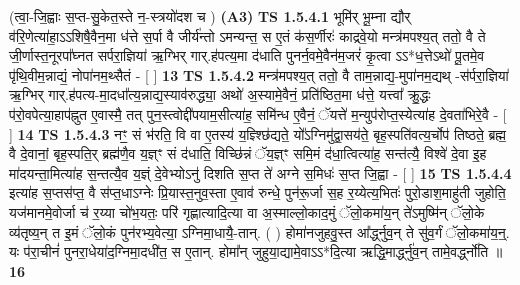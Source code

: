 \documentclass[17pt]{extarticle}
\begin{document}
                      (त्वा॒-जि॒ह्वाः स॒प्त-सु॒केत॒स्ते न॒-स्त्रयो॑दश च )  \textbf{(A3)} \newline \newline
                                        \textbf{ TS 1.5.4.1} \newline
                  भूमि॑र् भू॒म्ना द्यौर् व॑रि॒णेत्या॑हा॒ऽऽशिषै॒वैन॒मा ध॑त्ते स॒र्पा वै जीर्य॑न्तो ऽमन्यन्त॒ स ए॒तं क॑स॒र्णीरः॑ काद्रवे॒यो मन्त्र॑मपश्य॒त् ततो॒ वै ते जी॒र्णास्त॒नूरपा᳚घ्नत सर्परा॒ज्ञिया॑ ऋ॒ग्भिर् गार्.ह॑पत्य॒मा द॑धाति पुनर्न॒वमे॒वैन॑म॒जरं॑ कृ॒त्वा ऽऽ*ध॒त्तेऽथो॑ पू॒तमे॒व पृ॑थि॒वीम॒न्नाद्यं॒ नोपा॑नम॒थ्सैतं - [ ] \textbf{  13} \newline
                  \newline
                                \textbf{ TS 1.5.4.2} \newline
                  मन्त्र॑मपश्य॒त् ततो॒ वै ताम॒न्नाद्य॒-मुपा॑नम॒द्यथ् -स॑र्परा॒ज्ञिया॑ ऋ॒ग्भिर् गार्.ह॑पत्य-मा॒दधा᳚त्य॒न्नाद्य॒स्याव॑रुद्ध्या॒ अथो॑ अ॒स्यामे॒वैनं॒ प्रति॑ष्ठित॒मा ध॑त्ते॒ यत्त्वा᳚ क्रु॒द्धः प॑रो॒वपेत्या॒हाप॑ह्नुत ए॒वास्मै॒ तत् पुन॒स्त्वोद्दी॑पयाम॒सीत्या॑ह॒ समि॑न्ध ए॒वैनं॒ ॅयत्ते॑ म॒न्युप॑रोप्त॒स्येत्या॑ह दे॒वता॑भिरे॒वै - [ ] \textbf{  14} \newline
                  \newline
                                \textbf{ TS 1.5.4.3} \newline
                  नꣳ॒॒ सं भ॑रति॒ वि वा ए॒तस्य॑ य॒ज्ञ्श्छि॑द्यते॒ यो᳚ऽग्निमु॑द्वा॒सय॑ते॒ बृह॒स्पति॑वत्य॒र्चोप॑ तिष्ठते॒ ब्रह्म॒ वै दे॒वानां॒ बृह॒स्पति॒र् ब्रह्म॑णै॒व य॒ज्ञ्ꣳ सं द॑धाति॒ विच्छि॑न्नं ॅय॒ज्ञ्ꣳ समि॒मं द॑धा॒त्वित्या॑ह॒ सन्त॑त्यै॒ विश्वे॑ दे॒वा इ॒ह मा॑दयन्ता॒मित्या॑ह स॒न्तत्यै॒व य॒ज्ञ्ं दे॒वेभ्योऽनु॑ दिशति स॒प्त ते॑ अग्ने स॒मिधः॑ स॒प्त जि॒ह्वा - [ ] \textbf{  15} \newline
                  \newline
                                \textbf{ TS 1.5.4.4} \newline
                  इत्या॑ह स॒प्तस॑प्त॒ वै स॑प्त॒धाऽग्नेः प्रि॒यास्त॒नुव॒स्ता ए॒वाव॑ रुन्धे॒ पुन॑रू॒र्जा स॒ह र॒य्येत्य॒भितः॑ पुरो॒डाश॒माहु॑ती जुहोति॒ यज॑मानमे॒वोर्जा च॑ र॒य्या चो॑भ॒यतः॒ परि॑ गृह्णात्यादि॒त्या वा अ॒स्माल्लो॒काद॒मुं ॅलो॒कमा॑य॒॒न् ते॑ऽमुष्मि॑न् ॅलो॒के व्य॑तृष्य॒न् त इ॒मं ॅलो॒कं पुन॑रभ्य॒वेत्या॒ ऽग्निमा॒धायै॒-तान्. ( ) होमा॑नजुहवु॒स्त आ᳚र्द्ध्नुव॒॒न् ते सु॑व॒र्गं ॅलो॒कमा॑य॒न्॒. यः प॑रा॒चीनं॑ पुनरा॒धेया॑द॒ग्निमा॒दधी॑त॒ स ए॒तान्. होमा᳚न् जुहुया॒द्यामे॒वाऽऽ*दि॒त्या ऋद्धि॒मार्द्ध्नु॑व॒न् तामे॒वर्द्ध्नो॑ति ॥ \textbf{  16} \newline
\end{document}
